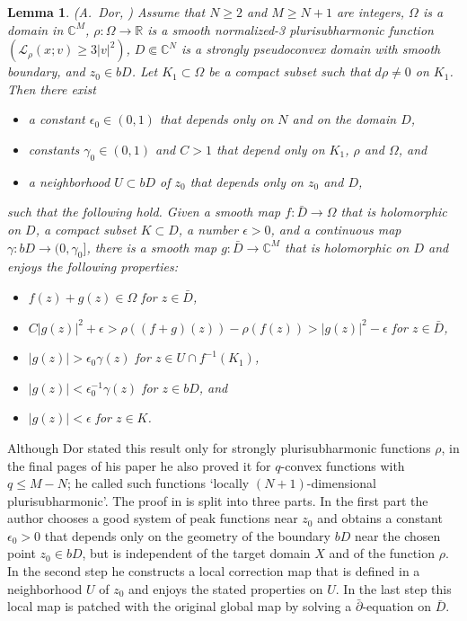 \documentclass[11pt]{amsart}
\numberwithin{equation}{section}
\newtheorem{lemma}[theorem]{Lemma}
\theoremstyle{definition}
\begin{document}
\begin{lemma}
\label{LemmaDor}
{\rm (A.\ Dor, \cite[Lemma 1]{Dor1})}
Assume that $N\ge 2$ and $M\ge N+1$ are integers, $\Omega$ is a domain
in ${\mathbb{C}}^M$, $\rho\colon\Omega \to{\mathbb{R}}$ is a smooth normalized-3 
plurisubharmonic function $({\mathcal{L}}_\rho(x;v)\ge 3|v|^2)$, $D{\Subset} {\mathbb{C}}^N$ is 
a strongly pseudoconvex domain with smooth boundary, 
and $z_0\in bD$. Let $K_1\subset\Omega$ be a compact subset such
that $d\rho\ne 0$ on $K_1$. Then there exist 
\begin{itemize}
\item a constant $\epsilon_0\in (0,1)$ that depends only on $N$ 
and on the domain $D$, 
\item constants $\gamma_0\in (0,1)$ and $C>1$ that depend only on
$K_1$, $\rho$ and $\Omega$, and 
\item
a neighborhood $U\subset bD$ of $z_0$ that depends only on $z_0$ 
and $D$, 
\end{itemize}
such that the following hold.
Given a smooth map $f\colon\bar D \to \Omega$ that is holomorphic on $D$, 
a compact subset $K\subset D$, a number ${\epsilon}>0$, and a continuous map 
$\gamma\colon bD\to (0,\gamma_0]$, there is a smooth map 
$g\colon\bar D \to {\mathbb{C}}^M$ that is holomorphic on $D$ and enjoys
the following properties:
\begin{itemize}
\item[(i)] $f(z)+g(z)\in \Omega$ for $z\in \bar D$,
\item[(ii)] $C|g(z)|^2+{\epsilon}>\rho((f+g)(z))-\rho(f(z))>|g(z)|^2-{\epsilon}$ for $z\in \bar D$,
\item[(iii)] $|g(z)|>{\epsilon}_0\gamma(z)$ for $z\in U\cap f^{-1}(K_1)$,
\item[(iv)] $|g(z)|<{\epsilon}_0^{-1}\gamma(z)$ for $z\in bD$, and
\item[(v)] $|g(z)|<{\epsilon}$ for $z\in K$.
\end{itemize}
\end{lemma}

Although Dor stated this result 
only for strongly plurisubharmonic functions $\rho$, 
in the final pages of his paper he also proved it for $q$-convex functions with $q\le M-N$; he called such functions `locally $(N+1)$-dimensional plurisubharmonic'.
The proof in \cite{Dor1} is split into three parts. 
In the first part the author chooses a good system of peak functions 
near $z_0$ and obtains a constant $\epsilon_0>0$ that depends only 
on the geometry of the boundary $bD$ near the chosen point $z_0\in bD$, 
but is independent of the target domain $X$ and of the function $\rho$. 
In the second step he constructs a local correction map
that is defined in a neighborhood $U$ of $z_0$ and enjoys  
the stated properties on $U$. In the last step this local map 
is patched with the original global map by solving a ${\bar\partial}$-equation 
on $\bar D$.
\end{document}

